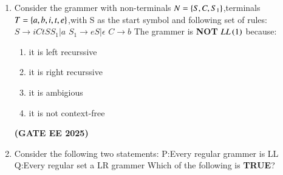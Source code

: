 \documentclass[journal,12pt,onecolumn]{IEEEtran}
\theoremstyle{remark}
\begin{document}
\begin {center}
\begin{enumerate}
\begin{enumerate}
     \end{enumerate}
     \hfill \textbf{(GATE EE 2025)}
     \item Consider the grammer with non-terminals $N=\left\{S,C,S_1\right\}$,terminals $T=\left\{a,b,i,t,e\right\}$,with S as the start symbol and following set of rules:
     \newline
     $S\longrightarrow iCtSS_1|a$
     \newline
     $S_1\longrightarrow eS|\epsilon$
     \newline
     $C \longrightarrow b$
    \newline
    The grammer is \textbf{NOT} $LL\left(1\right)$ because:
    \begin{enumerate}
        \item it is left recurssive 
        \item it is right recurssive
        \item it is ambigious
        \item it is not context-free
    \end{enumerate}
    \hfill \textbf{(GATE EE 2025)}
    
      
    \item Consider the following two statements:
    \newline
    P:Every regular grammer is LL
    \newline 
    Q:Every regular set a LR grammer
    \newline 
    Which of the following is \textbf{TRUE}?
    \begin{enumerate}
\end{enumerate}
\end{enumerate}
\end{center}
\end{document}
